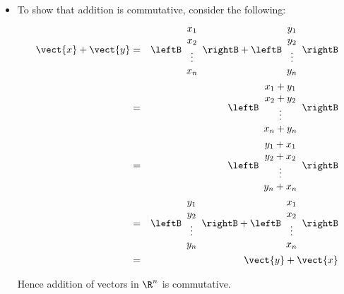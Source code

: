 \begin{solution}
\begin{itemize}
\item
To show that addition is commutative, consider the following:
\begin{eqnarray*}
\vect{x} + \vect{y} &=& \leftB \begin{array}{c}
x_1 \\
x_2 \\
\vdots \\
x_n
\end{array} \rightB + \leftB \begin{array}{c}
y_1 \\
y_2 \\
\vdots \\
y_n
\end{array} \rightB \\
&=& \leftB \begin{array}{c}
x_1 + y_1 \\
x_2 + y_2 \\
\vdots \\
x_n + y_n 
\end{array} \rightB \\ 
&=& \leftB \begin{array}{c}
y_1 + x_1 \\
y_2 + x_2 \\
\vdots \\
y_n + x_n 
\end{array} \rightB \\ 
&=& \leftB \begin{array}{c}
y_1 \\
y_2 \\
\vdots \\
y_n
\end{array} \rightB + \leftB \begin{array}{c}
x_1 \\
x_2 \\
\vdots \\
x_n
\end{array} \rightB \\
&=& \vect{y} + \vect{x}
\end{eqnarray*}

Hence addition of vectors in $\R^n$ is commutative. 


\end{itemize}
\end{solution}
